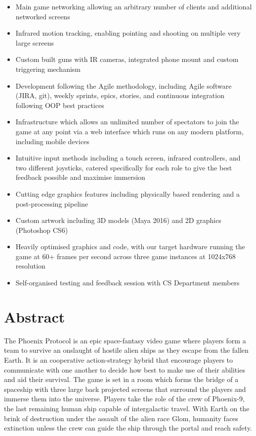 \documentclass[a4paper,11pt]{article}
\begin{document}
\begin{itemize}
	\large

  \item Main game networking allowing an arbitrary number of clients and additional networked screens
  \item Infrared motion tracking, enabling pointing and shooting on multiple very large screens
  \item Custom built guns with IR cameras, integrated phone mount and custom triggering mechanism
  \item Development following the Agile methodology, including Agile software (JIRA, git), weekly sprints, epics, stories, and continuous integration following OOP best practices
  \item Infrastructure which allows an unlimited number of spectators to join the game at any point via a web interface which runs on any modern platform, including mobile devices
  \item Intuitive input methods including a touch screen, infrared controllers, and two different joysticks, catered specifically for each role to give the best feedback possible and maximise immersion 
  \item Cutting edge graphics features including physically based rendering and a post-processing pipeline
  \item Custom artwork including 3D models (Maya 2016) and 2D graphics (Photoshop CS6)
  \item Heavily optimised graphics and code, with our target hardware running the game at 60+ frames per second across three game instances at 1024x768 resolution
  \item Self-organised testing and feedback session with CS Department members
\end{itemize}

\clearpage

\section{Abstract}
The Phoenix Protocol is an epic space-fantasy video game where players form a team to survive an onslaught of hostile alien ships as they escape from the fallen Earth. It is an cooperative action-strategy hybrid that encourage players to communicate with one another to decide how best to make use of their abilities and aid their survival. The game is set in a room which forms the bridge of a spaceship with three large back projected screens that surround the players and immerse them into the universe. 
Players take the role of the crew of Phoenix-9, the last remaining human ship capable of intergalactic travel. With Earth on the brink of destruction under the assault of the alien race Glom, humanity faces extinction unless the crew can guide the ship through the portal and reach safety.
\end{document}
